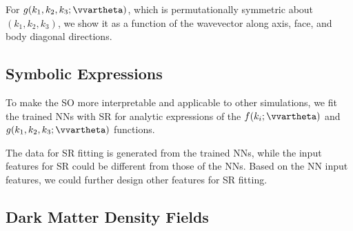 \documentclass[modern, trackchanges, dvipsnames]{aastex631}
\begin{document}
For $g(k_1,k_2,k_3;\vvartheta)$, which is permutationally symmetric
about $(k_1, k_2, k_3)$, we show it as a function of the wavevector
along axis, face, and body diagonal directions.


\subsection{Symbolic Expressions}

To make the SO more interpretable and applicable to other simulations,
we fit the trained NNs with SR for analytic expressions of the $f(k_i;
\vvartheta)$ and $g(k_1, k_2, k_3; \vvartheta)$ functions.

The data for SR fitting is generated from the trained NNs, while the
input features for SR could be different from those of the NNs.
Based on the NN input features, we could further design other features
for SR fitting.




\subsection{Dark Matter Density Fields}
\end{document}
